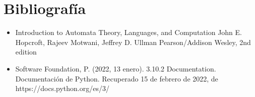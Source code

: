 \documentclass{article}
\begin{document}
\section{Bibliograf\'ia}
\begin{itemize}
    \item Introduction to Automata Theory, Languages, and Computation
John E. Hopcroft, Rajeev Motwani, Jeffrey D. Ullman
Pearson/Addison Wesley, 2nd edition
    \item Software Foundation, P. (2022, 13 enero). 3.10.2 Documentation. Documentación de Python. Recuperado 15 de febrero de 2022, de https://docs.python.org/es/3/
\end{itemize}
\end{document}
